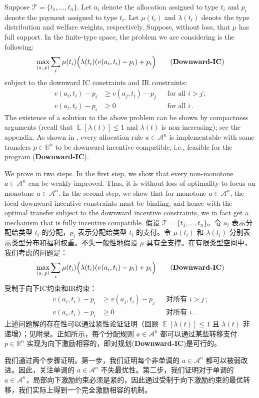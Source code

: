 \documentclass[12pt,letterpaper]{article}
\newenvironment{original}{\color{black}\noindent}{}
\newenvironment{translation}{\color{blue}\noindent}{}
\theoremstyle{plain}
\theoremstyle{definition}
\theoremstyle{remark}
\DeclareMathOperator{\E}{\mathds{E}}
\newcommand{\R}{\mathds{R}}
\renewcommand{\1}{\mathds{1}}
\theoremstyle{definition}
\begin{document}
\begin{original}
Suppose $\mathcal{T} = \{t_1, \dots, t_n\}$. Let $a_i$ denote the allocation assigned to type $t_i$ and $p_i$ denote the payment assigned to type $t_i$. Let $\mu(t_i)$ and $\lambda(t_i)$ denote the type distribution and welfare weights, respectively. Suppose, without loss, that $\mu$ has full support. In the finite-type space, the problem we are considering is the following:
\[\max_{(a,\, p)}\sum_i \mu(t_i) \Big(\lambda(t_i) (v(a_i, t_i) - p_i) + p_i\Big)  \tag{\textbf{Downward-IC}}\]
subject to the downward IC constraints and IR constraints:
\begin{align*}
    v(a_i, t_i) - p_i &\geq v(a_j, t_i) - p_j && \text{for all $i > j$}\,;\\
    v(a_i, t_i) - p_i &\geq 0 && \text{for all $i$}\,.
\end{align*}
The existence of a solution to the above problem can be shown by compactness arguments (recall that $\E[\lambda(t)] \leq 1$ and $\lambda(t)$ is non-increasing); see the appendix. As shown in \citet{yang2022costly}, every allocation rule $a \in \mathcal{A}^n$ is implementable with some transfers $p \in \R^n$ to be downward incentive compatible, i.e., feasible for the program (\textbf{Downward-IC}).

We prove  in two steps. In the first step, we show that every non-monotone $a \in \mathcal{A}^n$ can be weakly improved. Thus, it is without loss of optimality to focus on monotone $a \in \mathcal{A}^n$. In the second step, we show that for monotone $a \in \mathcal{A}^n$, the local downward incentive constraints must be binding, and hence with the optimal transfer subject to the downward incentive constraints, we in fact get a mechanism that is fully incentive compatible.
\end{original}
\begin{translation}
假设 $\mathcal{T} = \{t_1, \dots, t_n\}$。令 $a_i$ 表示分配给类型 $t_i$ 的分配，$p_i$ 表示分配给类型 $t_i$ 的支付。令 $\mu(t_i)$ 和 $\lambda(t_i)$ 分别表示类型分布和福利权重。不失一般性地假设 $\mu$ 具有全支撑。在有限类型空间中，我们考虑的问题是：
\[\max_{(a,\, p)}\sum_i \mu(t_i) \Big(\lambda(t_i) (v(a_i, t_i) - p_i) + p_i\Big)  \tag{\textbf{Downward-IC}}\]
受制于向下IC约束和IR约束：
\begin{align*}
    v(a_i, t_i) - p_i &\geq v(a_j, t_i) - p_j && \text{对所有 $i > j$}\,;\\
    v(a_i, t_i) - p_i &\geq 0 && \text{对所有 $i$}\,.
\end{align*}
上述问题解的存在性可以通过紧性论证证明（回顾 $\E[\lambda(t)] \leq 1$ 且 $\lambda(t)$ 非递增）；见附录。正如\citet{yang2022costly}所示，每个分配规则 $a \in \mathcal{A}^n$ 都可以通过某些转移支付 $p \in \R^n$ 实现为向下激励相容的，即对规划(\textbf{Downward-IC})是可行的。

我们通过两个步骤证明。第一步，我们证明每个非单调的 $a \in \mathcal{A}^n$ 都可以被弱改进。因此，关注单调的 $a \in \mathcal{A}^n$ 不失最优性。第二步，我们证明对于单调的 $a \in \mathcal{A}^n$，局部向下激励约束必须是紧的，因此通过受制于向下激励约束的最优转移，我们实际上得到一个完全激励相容的机制。
\end{translation}
\end{document}
